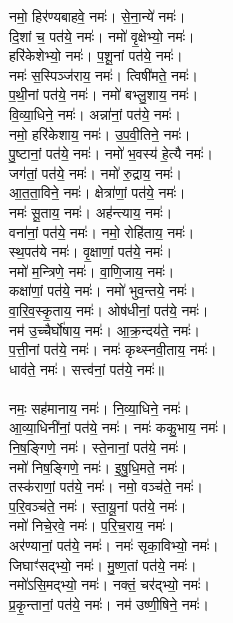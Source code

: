 नमो॒ हिर॑ण्यबाहवे॒ नमः॑। से॒ना॒न्ये॑ नमः॑।\\
दि॒शां च॒ पत॑ये॒ नमः॑। नमो॑ वृ॒क्षेभ्यो॒ नमः॑।\\
हरि॑केशेभ्यो॒ नमः॑। प॒शू॒नां पत॑ये॒ नमः॑।\\
नमः॑ स॒स्पिञ्ज॑राय॒ नमः॑। त्विषी॑मते॒ नमः॑।\\
प॒थी॒नां पत॑ये॒ नमः॑। नमो॑ बभ्लु॒शाय॒ नमः॑।\\
वि॒व्या॒धिने॒ नमः॑। अन्ना॑नां॒ पत॑ये॒ नमः॑। \\
नमो॒ हरि॑केशाय॒ नमः॑। उ॒प॒वी॒तिने॒ नमः॑।\\
पु॒ष्टानां॒ पत॑ये॒ नमः॑। नमो॑ भ॒वस्य॑ हे॒त्यै नमः॑।\\
जग॑तां॒ पत॑ये॒ नमः॑। नमो॑ रु॒द्राय॒ नमः॑।\\
आ॒त॒ता॒विने॒ नमः॑। क्षेत्रा॑णां॒ पत॑ये॒ नमः॑। \\
नमः॑ सू॒ताय॒ नमः॑। अह॑न्त्याय॒ नमः॑।\\
वना॑नां॒  पत॑ये॒ नमः॑। नमो॒ रोहि॑ताय॒ नमः॑।\\
स्थ॒पत॑ये नमः॑। वृ॒क्षाणां॒ पत॑ये॒ नमः॑।\\
नमो॑ म॒न्त्रिणे॒ नमः॑। वा॒णि॒जाय॒ नमः॑।\\
कक्षा॑णां॒ पत॑ये॒ नमः॑। नमो॑ भुव॒न्तये॒ नमः॑।\\
वा॒रि॒व॒स्कृ॒ताय॒ नमः॑। ओष॑धीनां॒ पत॑ये॒ नमः॑।\\
नम॑ उ॒च्चैर्घो॑षाय॒ नमः॑। आ॒क्र॒न्दय॑ते॒ नमः॑।\\
प॒त्ती॒नां पत॑ये॒ नमः॑। नमः॑ कृथ्स्नवी॒ताय॒ नमः॑।\\
धाव॑ते॒ नमः॑। सत्त्व॑नां॒ पत॑ये॒ नमः॑॥\\
\\
नमः॒ सह॑मानाय॒ नमः॑। नि॒व्या॒धिने॒ नमः॑।\\
आ॒व्या॒धिनी॑नां॒ पत॑ये॒ नमः॑। नमः॑ ककु॒भाय॒ नमः॑।\\
नि॒ष॒ङ्गिणे॒ नमः॑। स्ते॒नानां॒ पत॑ये॒ नमः॑।\\
नमो॑ निष॒ङ्गिणे॒ नमः॑। इ॒षु॒धि॒मते॒ नमः॑।\\
तस्क॑राणां॒ पत॑ये॒ नमः॑। नमो॒ वञ्च॑ते॒ नमः॑।\\
प॒रि॒वञ्च॑ते॒ नमः॑। स्ता॒यू॒नां पत॑ये॒ नमः॑।\\
नमो॑ निचे॒रवे॒ नमः॑। प॒रि॒च॒राय॒ नमः॑।\\
अर॑ण्यानां॒ पत॑ये॒ नमः॑। नमः॑ सृका॒विभ्यो॒ नमः॑।\\
जिघाꣳ॑सद्भ्यो॒ नमः॑। मु॒ष्ण॒तां पत॑ये॒ नमः॑।\\
नमो॑ऽसि॒मद्भ्यो॒ नमः॑। नक्तं॒ चर॑द्भ्यो॒ नमः॑।\\
प्र॒कृ॒न्तानां॒ पत॑ये॒ नमः॑। नम॑ उष्णी॒षिने॒ नमः॑।\\
